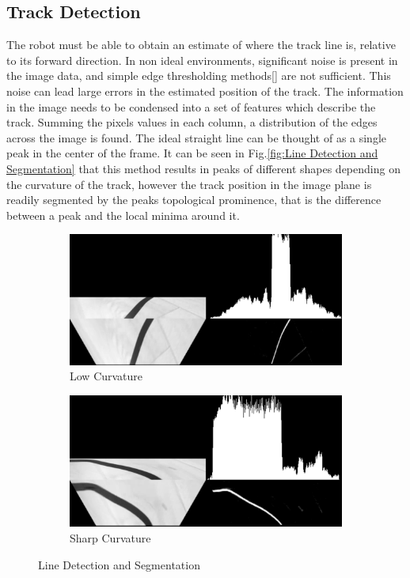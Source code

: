        \subsection{Track Detection}
        The robot must be able to obtain an estimate of where the track line is, relative to its forward direction.
        In non ideal environments, significant noise is present in the image data, 
        and simple edge thresholding methods[] are not sufficient. This noise can lead large errors
        in the estimated position of the track. The information in the image needs to be condensed into a set of features
        which describe the track. Summing the pixels values in each column, a distribution of the edges 
        across the image is found. The ideal straight line can be thought of as a single peak in the center of the frame.  
        It can be seen in Fig.\ref{fig:Line Detection and Segmentation} that this method results in peaks of different 
        shapes depending on the curvature of the track, however the track position in the image plane is readily 
        segmented by the peaks topological prominence, that is the difference between 
        a peak and the local minima around it. 
        \begin{figure}[H]
            \centering
            \begin{subfigure}[b]{0.45\textwidth}
                \includegraphics[width=\textwidth]{visionpipeline/vizSmallCurve.png}
                \caption{Low Curvature}
                \label{fig:LineDetection}
            \end{subfigure}
            \hfill
            \begin{subfigure}[b]{0.45\textwidth}
                \includegraphics[width=\textwidth]{visionpipeline/vizBigCurve.png}
                \caption{Sharp Curvature}
                \label{fig:Sharp Curvature}
            \end{subfigure}
            \caption{Line Detection and Segmentation}   
        \end{figure}

